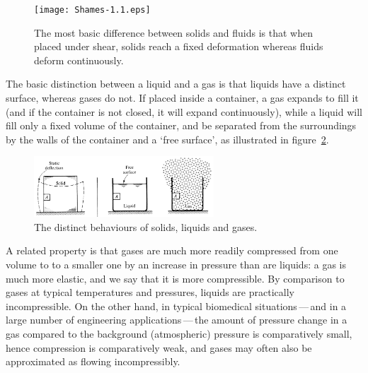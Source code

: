 \documentclass[twoside,11pt]		{report}
\begin{document}
\begin{figure}
\begin{center}
\texttt{[image: Shames-1.1.eps]}
\end{center}
\caption{The most basic difference between solids and fluids is that
  when placed under shear, solids reach a fixed deformation whereas
  fluids deform continuously.
  \citep[From][]{shames62}}
\label{fig.def}
\end{figure}

The basic distinction between a liquid and a gas is that liquids have
a distinct surface, whereas gases do not. If placed inside a
container, a gas expands to fill it (and if the container is not
closed, it will expand continuously), while a liquid will fill only a
fixed volume of the container, and be separated from the surroundings
by the walls of the container and a `free surface', as illustrated in
figure~\ref{fig.slg}.

\begin{figure}
\begin{center}
\includegraphics[width=0.6\textwidth]{White-1.1.eps}
\end{center}
\caption{The distinct behaviours of solids, liquids and
gases. \citep[From][]{white86}}
\label{fig.slg}
\end{figure}

A related property is that gases are much more readily compressed from
one volume to to a smaller one by an increase in pressure than are
liquids: a gas is much more elastic, and we say that it is more
compressible. By comparison to gases at typical temperatures and
pressures, liquids are practically incompressible. On the other hand,
in typical biomedical situations\,---\,and in a large number of
engineering applications\,---\,the amount of pressure change in a gas
compared to the background (atmospheric) pressure is comparatively
small, hence compression is comparatively weak, and gases may often
also be approximated as flowing incompressibly.
\end{document}
